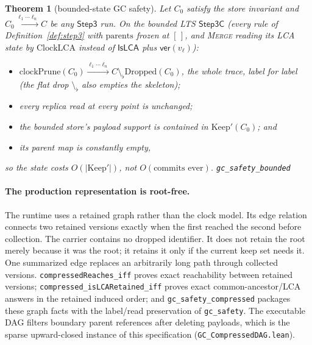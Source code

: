 \documentclass[11pt]{article}
\newtheorem{theorem}{Theorem}[section]
\newcommand{\lean}[1]{\texttt{#1}}
\newcommand{\code}[1]{\texttt{#1}}
\begin{document}
\begin{theorem}[bounded-state GC safety]
\label{thm:gcbounded}
Let $C_0$ satisfy the store invariant and
$C_0 \xrightarrow{\ell_1 \cdots \ell_n} C$ be any $\mathsf{Step3}$ run.
On the bounded LTS $\mathsf{Step3C}$ (every rule of
Definition~\ref{def:step3} with $\mathrm{parents}$ frozen at $[\,]$, and
\textsc{Merge} reading its LCA state by $\mathrm{ClockLCA}$ instead of
$\mathsf{IsLCA}$ plus $\mathsf{ver}(v_\ell)$):
\begin{itemize}[leftmargin=2.2em]
\item[(i)] $\mathrm{clockPrune}(C_0) \xrightarrow{\ell_1 \cdots \ell_n}
  C \setminus_{\flat} \mathrm{Dropped}(C_0)$, the whole trace, label for
  label (the flat drop $\setminus_{\flat}$ also empties the skeleton);
\item[(ii)] every replica read at every point is unchanged;
\item[(iii)] the bounded store's payload support is contained in
  $\mathrm{Keep}'(C_0)$; and
\item[(iv)] its parent map is constantly empty,
\end{itemize}
so the state costs $O(|\mathrm{Keep}'|)$, not $O(\text{commits
ever})$.
\hfill\lean{gc\_safety\_bounded}
\end{theorem}

\paragraph{The production representation is root-free.} The runtime uses a
retained graph rather than the clock model.  Its edge relation connects two
retained versions exactly when the first reached the second before collection.
The carrier contains no dropped identifier.  It does not retain the root merely
because it was the root; it retains it only if the current keep set needs it.
One summarized edge replaces an arbitrarily long path through collected
versions.  \lean{compressedReaches\_iff} proves exact reachability between
retained versions; \lean{compressed\_isLCARetained\_iff} proves exact
common-ancestor/LCA answers in the retained induced order; and
\lean{gc\_safety\_compressed} packages these graph facts with the
label/read preservation of \lean{gc\_safety}.  The executable DAG filters
boundary parent references after deleting payloads, which is the sparse
upward-closed instance of this specification
(\code{GC\_CompressedDAG.lean}).
\end{document}
